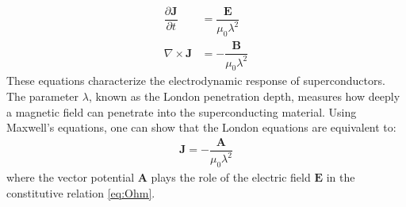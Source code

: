 \documentclass[12pt,a4paper,oneside,openany]{book}
\begin{document}
\begin{align}
	\dfrac{\partial \mathbf{J}}{\partial t} &=  \dfrac{\mathbf{E}}{\mu_0 \lambda^2} \label{eq:London_1} \\
	\nabla \times \mathbf{J} &= - \dfrac{\mathbf{B}}{\mu_0 \lambda^2} \label{eq:London_2}
\end{align}
These equations characterize the electrodynamic response of superconductors. The parameter $\lambda$, known as the London penetration depth, measures how deeply a magnetic field can penetrate into the superconducting material. Using Maxwell’s equations, one can show that the London equations are equivalent to:
\begin{align}
	\mathbf{J} = - \dfrac{\mathbf{A}}{\mu_0 \lambda^2}
	\label{eq:London:gauge}
\end{align}
where the vector potential $\mathbf{A}$ plays the role of the electric field $\mathbf{E}$ in the constitutive relation \eqref{eq:Ohm}. 
\end{document}
